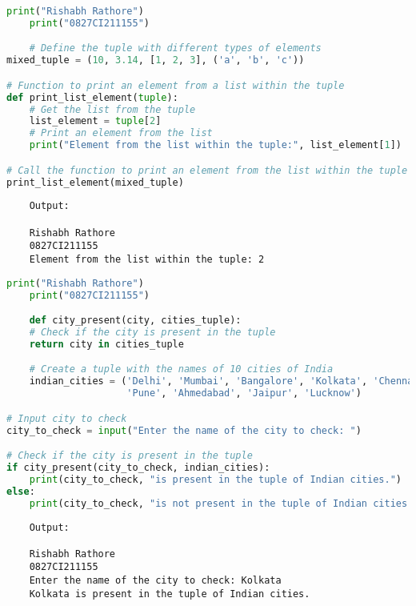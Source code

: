 \documentclass{report}
\begin{document}
\newpage


\sol 
\begin{lstlisting}[language=Python]
	print("Rishabh Rathore")
	print("0827CI211155")

	# Define the tuple with different types of elements
mixed_tuple = (10, 3.14, [1, 2, 3], ('a', 'b', 'c'))

# Function to print an element from a list within the tuple
def print_list_element(tuple):
    # Get the list from the tuple
    list_element = tuple[2]
    # Print an element from the list
    print("Element from the list within the tuple:", list_element[1])

# Call the function to print an element from the list within the tuple
print_list_element(mixed_tuple)
\end{lstlisting}

\begin{verbatim}
	Output:

	Rishabh Rathore
	0827CI211155
	Element from the list within the tuple: 2

\end{verbatim}



\newpage


\sol 
\begin{lstlisting}[language=Python]
	print("Rishabh Rathore")
	print("0827CI211155")

	def city_present(city, cities_tuple):
    # Check if the city is present in the tuple
    return city in cities_tuple

	# Create a tuple with the names of 10 cities of India
	indian_cities = ('Delhi', 'Mumbai', 'Bangalore', 'Kolkata', 'Chennai', 'Hyderabad',
					 'Pune', 'Ahmedabad', 'Jaipur', 'Lucknow')

# Input city to check
city_to_check = input("Enter the name of the city to check: ")

# Check if the city is present in the tuple
if city_present(city_to_check, indian_cities):
    print(city_to_check, "is present in the tuple of Indian cities.")
else:
    print(city_to_check, "is not present in the tuple of Indian cities.")
\end{lstlisting}

\begin{verbatim}
	Output:

	Rishabh Rathore
	0827CI211155
	Enter the name of the city to check: Kolkata
	Kolkata is present in the tuple of Indian cities.

\end{verbatim}
\end{document}
